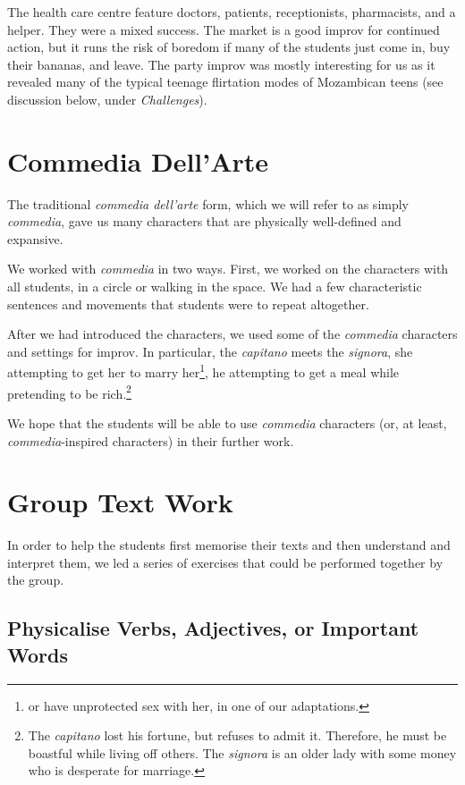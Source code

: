 \documentclass[article,twocolumn,twoside]{memoir}
\begin{document}
The health care centre feature doctors, patients, receptionists, pharmacists,
and a helper. They were a mixed success. The market is a good improv for
continued action, but it runs the risk of boredom if many of the students just
come in, buy their bananas, and leave. The party improv was mostly interesting
for us as it revealed many of the typical teenage flirtation modes of
Mozambican teens (see discussion below, under \emph{Challenges}).

\section{Commedia Dell'Arte}

The traditional \textit{commedia dell'arte} form, which we will refer to as
simply \textit{commedia}, gave us many characters that are physically
well-defined and expansive.

We worked with \textit{commedia} in two ways. First, we worked on the characters
with all students, in a circle or walking in the space. We had a few
characteristic sentences and movements that students were to repeat altogether.

After we had introduced the characters, we used some of the \textit{commedia}
characters and settings for improv. In particular, the \textit{capitano} meets
the \textit{signora}, she attempting to get her to marry her\footnote{or have
unprotected sex with her, in one of our adaptations.}, he attempting to get a
meal while pretending to be rich.\footnote{The \textit{capitano} lost his
fortune, but refuses to admit it. Therefore, he must be boastful while living
off others. The \textit{signora} is an older lady with some money who is
desperate for marriage.}

We hope that the students will be able to use \textit{commedia} characters (or,
at least, \textit{commedia}-inspired characters) in their further work.

\section{Group Text Work}

In order to help the students first memorise their texts and then understand
and interpret them, we led a series of exercises that could be performed
together by the group.

\subsection{Physicalise Verbs, Adjectives, or Important Words}
\end{document}
